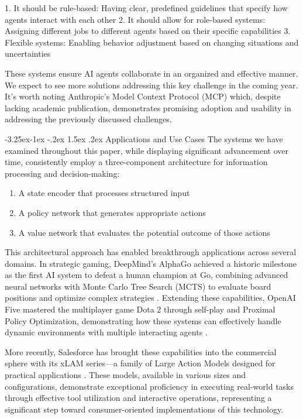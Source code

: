\documentclass[journal,twoside,10pt]{IEEEtran}
\makeatletter
\renewcommand\subsection{\@startsection{subsection}{2}{\z@}%
                       {-3.25ex\@plus -1ex \@minus -.2ex}%
                       {1.5ex \@plus .2ex}%
                       {\normalfont\large\bfseries}}
\makeatother
\begin{document}
1. It should be rule-based: Having clear, predefined guidelines that specify how agents interact with each other
2. It should allow for role-based systems: Assigning different jobs to different agents based on their specific capabilities
3. Flexible systems: Enabling behavior adjustment based on changing situations and uncertainties

These systems ensure AI agents collaborate in an organized and effective manner. We expect to see more solutions addressing this key challenge in the coming year. It's worth noting Anthropic's Model Context Protocol (MCP) which, despite lacking academic publication, demonstrates promising adoption and usability in addressing the previously discussed challenges.

\subsection{Applications and Use Cases}
The systems we have examined throughout this paper, while displaying significant advancement over time, consistently employ a three-component architecture for information processing and decision-making:

\begin{enumerate}
    \item A state encoder that processes structured input
    \item A policy network that generates appropriate actions
    \item A value network that evaluates the potential outcome of those actions
\end{enumerate}

This architectural approach has enabled breakthrough applications across several domains. In strategic gaming, DeepMind's AlphaGo achieved a historic milestone as the first AI system to defeat a human champion at Go, combining advanced neural networks with Monte Carlo Tree Search (MCTS) to evaluate board positions and optimize complex strategies \cite{silver2016mastering}. Extending these capabilities, OpenAI Five mastered the multiplayer game Dota 2 through self-play and Proximal Policy Optimization, demonstrating how these systems can effectively handle dynamic environments with multiple interacting agents \cite{openai2019dota}.

More recently, Salesforce has brought these capabilities into the commercial sphere with its xLAM series—a family of Large Action Models designed for practical applications \cite{zhang2024xlam}. These models, available in various sizes and configurations, demonstrate exceptional proficiency in executing real-world tasks through effective tool utilization and interactive operations, representing a significant step toward consumer-oriented implementations of this technology.
\end{document}
